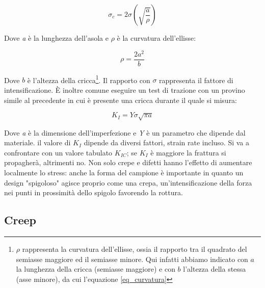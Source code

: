 \begin{equation}
    \sigma_c=2\sigma\left(\sqrt{\frac{a}{\rho}}\right)
\end{equation}

Dove \textit{a} è la lunghezza dell'asola e $\rho$ è la curvatura dell'ellisse:

\begin{equation}
    \rho = \frac{2 a^2}{b}
    \label{eq_curvatura}
\end{equation}

Dove $b$ è l'altezza della cricca\footnote{$\rho$ rappresenta la curvatura dell'ellisse, ossia il rapporto tra il quadrato del semiasse maggiore ed il semiasse minore. Qui infatti abbiamo indicato con $a$ la lunghezza della cricca (semiasse maggiore) e con $b$ l'altezza della stessa (asse minore), da cui l'equazione \ref{eq_curvatura}}.
Il rapporto con $\sigma$ rappresenta il fattore di intensificazione.
È inoltre comune eseguire un test di trazione con un provino simile al precedente in cui è presente una cricca durante il quale si misura:

\begin{equation}
    K_I=Y\sigma\sqrt{\pi a}
\end{equation}

Dove \textit{a} è la dimensione dell'imperfezione e \textit{Y} è un parametro che dipende dal materiale. il valore di $K_I$ dipende da diversi fattori, strain rate incluso. Si va a confrontare con un valore tabulato $K_{IC}$; se $K_I$ è maggiore la frattura si propagherà, altrimenti no. Non solo crepe e difetti hanno l'effetto di aumentare localmente lo stress: anche la forma del campione è importante in quanto un design "spigoloso" agisce proprio come una crepa, un'intensificazione della forza nei punti in prossimità dello spigolo favorendo la rottura.

\subsection{Creep}

